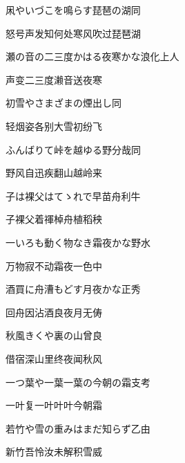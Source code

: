 \begin{haiku}
    {\FH 凩やいづこを鳴らす琵琶の湖}\hfill{\FH 同}

    {\FK 怒号声发知何处寒风吹过琵琶湖}
\end{haiku}

\begin{haiku}
    {\FH 瀬の音の二三度かはる夜寒かな}\hfill{\FH 浪化上人}

    {\FK 声变二三度濑音送夜寒}
\end{haiku}

\begin{haiku}
    {\FH 初雪やさまざまの煙出し}\hfill{\FH 同}

    {\FK 轻烟姿各别大雪初纷飞}
\end{haiku}

\begin{haiku}
    {\FH ふんばりて峠を越ゆる野分哉}\hfill{\FH 同}

    {\FK 野风自迅疾翻山越岭来}
\end{haiku}

\begin{haiku}
    {\FH 子は裸父はてゝれで早苗舟}\hfill{\FH 利牛}

    {\FK 子裸父着禈棹舟植稻秧}
\end{haiku}

\begin{haiku}
    {\FH 一いろも動く物なき霜夜かな}\hfill{\FH 野水}

    {\FK 万物寂不动霜夜一色中}
\end{haiku}

\begin{haiku}
    {\FH 酒買に舟漕もどす月夜かな}\hfill{\FH 正秀}

    {\FK 回舟因沾酒良夜月无俦}
\end{haiku}

\begin{haiku}
    {\FH {}秋風きくや裏の山}\hfill{\FH 曾良}

    {\FK 借宿深山里终夜闻秋风}
\end{haiku}

\begin{haiku}
    {\FH 一つ葉や一葉一葉の今朝の霜}\hfill{\FH 支考}

    {\FK 一叶复一叶叶叶今朝霜}
\end{haiku}

\begin{haiku}
    {\FH 若竹や雪の重みはまだ知らず}\hfill{\FH 乙由}

    {\FK 新竹吾怜汝未解积雪威}
\end{haiku}

